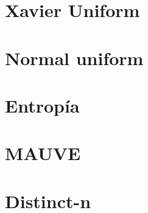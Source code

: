 \documentclass[11pt]{book}
\newcommand{\clearemptydoublepage}{\newpage{\pagestyle{empty}\cleardoublepage}}
\theoremstyle{plain}
\theoremstyle{definition}
\begin{document}
\section{Xavier Uniform} \label{sec:xavier}
\section{Normal uniform} \label{sec:normal}

\section{Entropía} \label{sec:entropia}

\section{MAUVE} \label{sec:mauve}


\section{Distinct-n} \label{sec:distinct-n}


\clearemptydoublepage
\end{document}
